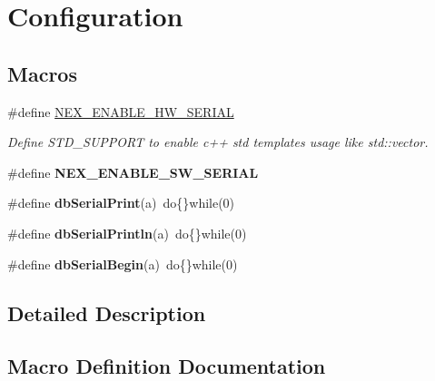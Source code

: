 \hypertarget{group___configuration}{}\section{Configuration}
\label{group___configuration}
\subsection*{Macros}
\begin{DoxyCompactItemize}
\item 
\#define \hyperlink{group___configuration_ga5446baadd7f775404556a957cf6d03fc}{N\+E\+X\+\_\+\+E\+N\+A\+B\+L\+E\+\_\+\+H\+W\+\_\+\+S\+E\+R\+I\+A\+L}
\begin{DoxyCompactList}\small\item\em Define S\+T\+D\+\_\+\+S\+U\+P\+P\+O\+R\+T to enable c++ std templates usage like std\+::vector. \end{DoxyCompactList}\item 
\hypertarget{group___configuration_ga90ca07f4dc231d7b3ecd20d615315445}{}\#define {\bfseries N\+E\+X\+\_\+\+E\+N\+A\+B\+L\+E\+\_\+\+S\+W\+\_\+\+S\+E\+R\+I\+A\+L}\label{group___configuration_ga90ca07f4dc231d7b3ecd20d615315445}

\item 
\hypertarget{group___configuration_gaf018322c574c0f39d5feb76995cdf2d6}{}\#define {\bfseries db\+Serial\+Print}(a)~do\{\}while(0)\label{group___configuration_gaf018322c574c0f39d5feb76995cdf2d6}

\item 
\hypertarget{group___configuration_ga7792c838c043fae9a630823f1c328a30}{}\#define {\bfseries db\+Serial\+Println}(a)~do\{\}while(0)\label{group___configuration_ga7792c838c043fae9a630823f1c328a30}

\item 
\hypertarget{group___configuration_gabec12d271fea8fd82696961bc9339edf}{}\#define {\bfseries db\+Serial\+Begin}(a)~do\{\}while(0)\label{group___configuration_gabec12d271fea8fd82696961bc9339edf}

\end{DoxyCompactItemize}


\subsection{Detailed Description}


\subsection{Macro Definition Documentation}
\hypertarget{group___configuration_ga5446baadd7f775404556a957cf6d03fc}{}
